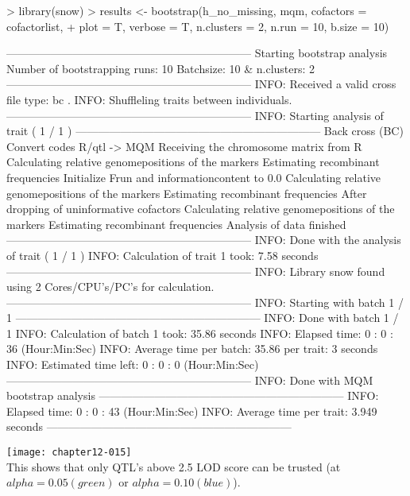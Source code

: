 \documentclass[a4paper]{article}
\begin{document}
\begin{Schunk}
\begin{Sinput}
> library(snow)
> results <- bootstrap(h_no_missing, mqm, cofactors = cofactorlist, 
+     plot = T, verbose = T, n.clusters = 2, n.run = 10, b.size = 10)
\end{Sinput}
\begin{Soutput}
------------------------------------------------------------------
Starting bootstrap analysis
Number of bootstrapping runs: 10 
Batchsize: 10  & n.clusters: 2 
------------------------------------------------------------------
INFO: Received a valid cross file type: bc .
INFO: Shuffleling traits between individuals.
------------------------------------------------------------------
INFO: Starting analysis of trait ( 1 / 1 )
------------------------------------------------------------------
Back cross (BC)
Convert codes R/qtl -> MQM
Receiving the chromosome matrix from R
Calculating relative genomepositions of the markers
Estimating recombinant frequencies
Initialize Frun and informationcontent to 0.0
Calculating relative genomepositions of the markers
Estimating recombinant frequencies
After dropping of uninformative cofactors
Calculating relative genomepositions of the markers
Estimating recombinant frequencies
Analysis of data finished
------------------------------------------------------------------
INFO: Done with the analysis of trait ( 1 / 1 )
INFO: Calculation of trait 1 took: 7.58  seconds
------------------------------------------------------------------
INFO: Library snow found using  2  Cores/CPU's/PC's for calculation.
------------------------------------------------------------------
INFO: Starting with batch 1 / 1 
------------------------------------------------------------------
INFO: Done with batch 1 / 1 
INFO: Calculation of batch 1 took: 35.86 seconds
INFO: Elapsed time: 0 : 0 : 36 (Hour:Min:Sec)
INFO: Average time per batch: 35.86  per trait: 3 seconds
INFO: Estimated time left: 0 : 0 : 0 (Hour:Min:Sec)
------------------------------------------------------------------
INFO: Done with MQM bootstrap analysis
------------------------------------------------------------------
INFO: Elapsed time: 0 : 0 : 43 (Hour:Min:Sec)
INFO: Average time per trait: 3.949 seconds
------------------------------------------------------------------
\end{Soutput}
\end{Schunk}
\texttt{[image: chapter12-015]}
\\
This shows that only QTL's above 2.5 LOD score can be trusted (at $alpha=0.05 (green)$ or $alpha=0.10 (blue)$).
\end{document}
